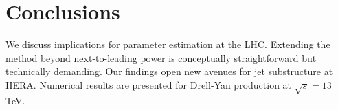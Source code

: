 \section{Conclusions}\label{sec:conclusions}

We discuss implications for parameter estimation at the LHC. Extending
the method beyond next-to-leading power is conceptually straightforward
but technically demanding. Our findings open new avenues for jet
substructure at HERA. Numerical results are presented for Drell-Yan
production at $\sqrt{s} = 13$ TeV.

